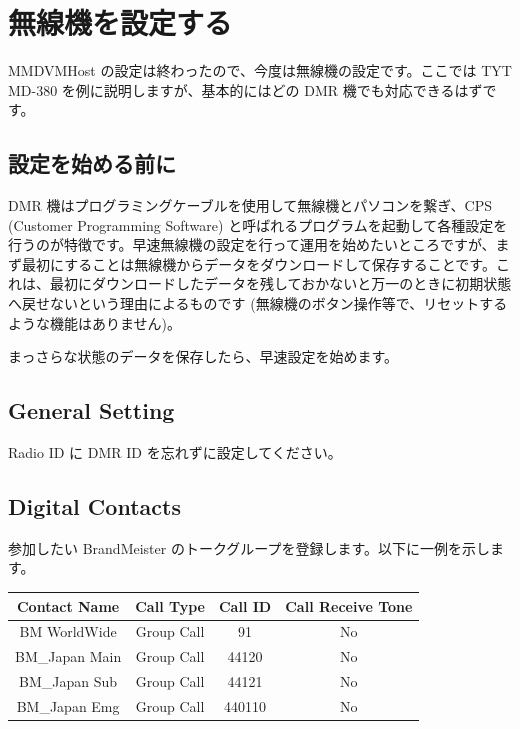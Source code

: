 \documentclass[a4j,oneside]{ujbook}
\begin{document}
\section{無線機を設定する}

MMDVMHost の設定は終わったので、今度は無線機の設定です。ここでは TYT MD-380 を例に説明しますが、基本的にはどの DMR 機でも対応できるはずです。

\subsection*{設定を始める前に}

DMR 機はプログラミングケーブルを使用して無線機とパソコンを繋ぎ、CPS (Customer Programming Software) と呼ばれるプログラムを起動して各種設定を行うのが特徴です。早速無線機の設定を行って運用を始めたいところですが、まず最初にすることは無線機からデータをダウンロードして保存することです。これは、最初にダウンロードしたデータを残しておかないと万一のときに初期状態へ戻せないという理由によるものです (無線機のボタン操作等で、リセットするような機能はありません)。

まっさらな状態のデータを保存したら、早速設定を始めます。

\subsection*{General Setting}

Radio ID に DMR ID を忘れずに設定してください。

\subsection*{Digital Contacts}

参加したい BrandMeister のトークグループを登録します。以下に一例を示します。

\begin{center}
 \begin{tabular}{|c|c|c|c|}
  \hline
  {Contact Name} & {Call Type} & {Call ID} & {Call Receive Tone} \\
  \hline
  {BM WorldWide} & {Group Call} & 91 & No \\
  {BM\_Japan Main} & {Group Call} & 44120 & No \\
  {BM\_Japan Sub} & {Group Call} & 44121 & No \\
  {BM\_Japan Emg} & {Group Call} & 440110 & No \\
  \hline
 \end{tabular}
\end{center}
\end{document}
